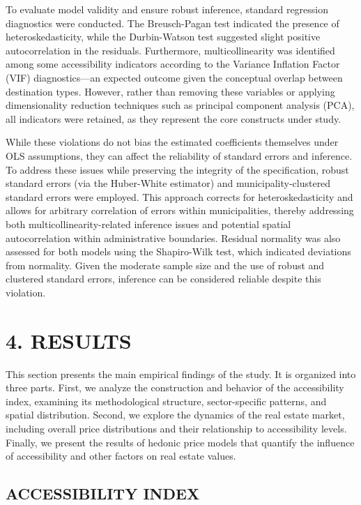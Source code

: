 \documentclass[
  12pt,
]{report}
\begin{document}
To evaluate model validity and ensure robust inference, standard
regression diagnostics were conducted. The Breusch-Pagan test indicated
the presence of heteroskedasticity, while the Durbin-Watson test
suggested slight positive autocorrelation in the residuals. Furthermore,
multicollinearity was identified among some accessibility indicators
according to the Variance Inflation Factor (VIF) diagnostics---an
expected outcome given the conceptual overlap between destination types.
However, rather than removing these variables or applying dimensionality
reduction techniques such as principal component analysis (PCA), all
indicators were retained, as they represent the core constructs under
study.

While these violations do not bias the estimated coefficients themselves
under OLS assumptions, they can affect the reliability of standard
errors and inference. To address these issues while preserving the
integrity of the specification, robust standard errors (via the
Huber-White estimator) and municipality-clustered standard errors were
employed. This approach corrects for heteroskedasticity and allows for
arbitrary correlation of errors within municipalities, thereby
addressing both multicollinearity-related inference issues and potential
spatial autocorrelation within administrative boundaries. Residual
normality was also assessed for both models using the Shapiro-Wilk test,
which indicated deviations from normality. Given the moderate sample
size and the use of robust and clustered standard errors, inference can
be considered reliable despite this violation.

\newpage

\chapter{4. RESULTS}\label{results}

This section presents the main empirical findings of the study. It is
organized into three parts. First, we analyze the construction and
behavior of the accessibility index, examining its methodological
structure, sector-specific patterns, and spatial distribution. Second,
we explore the dynamics of the real estate market, including overall
price distributions and their relationship to accessibility levels.
Finally, we present the results of hedonic price models that quantify
the influence of accessibility and other factors on real estate values.

\section{ACCESSIBILITY INDEX}\label{accessibility-index-1}
\end{document}
